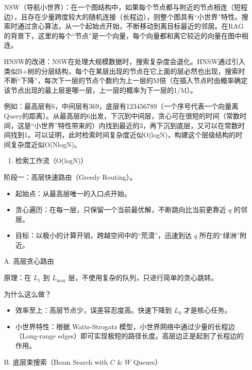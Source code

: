 NSW（导航小世界）：在一个图结构中，如果每个节点都与附近的节点相连（短程边），且存在少量跨度较大的随机连接（长程边），则整个图具有``小世界''特性。搜索时通过贪心算法，从一个起始点开始，不断移动到离目标最近的邻居。在RAG的背景下，这里的每个``节点''是一个向量，每个向量都和离它较近的向量在图中相连。

HNSW的改进：NSW在处理大规模数据时，搜索复杂度会退化。HNSW通过引入类似B+树的分层结构，每个在某层出现的节点在它上面的层必然也出现，搜索时不断``下降''，每次下一层的节点个数约为上一层的M倍（在插入节点时由概率确定该节点出现的最上层是哪一层，上一层的概率为下一层的1/M）。

例如：最高层有6，中间层有369，底层有123456789（一个序号代表一个向量离Query的距离）。从最高层的6出发，下沉到中间层，贪心可在很短的时间（常数时间，这是``小世界''特性带来的）内找到最近的3，再下沉到底层，又可以在常数时间找到1。可以证明，此时检索时间复杂度近似O(logN)，构建这个层级结构的时间复杂度近似O(NlogN)。

\begin{enumerate}
\def\labelenumi{\arabic{enumi}.}
\setcounter{enumi}{1}
\tightlist
\item
  检索工作流（O(logN)）
\end{enumerate}

阶段一：高层快速路由（Greedy Routing）。

\begin{itemize}
\tightlist
\item
  起始点：从最高层唯一的入口点开始。
\item
  贪心遍历：在每一层，只保留一个当前最优解，不断跳向比当前更靠近 \(q\) 的邻居。
\item
  目标：以极小的计算开销，跨越空间中的``荒漠''，迅速到达 \(q\) 所在的``绿洲''附近。
\end{itemize}

A. 高层贪心路由

原理：在 \(L_1\) 到 \(L_{\max}\) 层，不使用复杂的队列，只进行简单的贪心跳转。

为什么这么做？

\begin{itemize}
\tightlist
\item
  效率至上：高层节点少，误差容忍度高。快速下降到 \(L_0\) 才是核心任务。
\item
  小世界特性：根据 Watts-Strogatz 模型，小世界网络中通过少量的长程边（Long-range edges）即可实现极短的路径长度。高层边正是起到了长程边的作用。
\end{itemize}

B. 底层束搜索（Beam Search with \(C\) \& \(W\) Queues）

